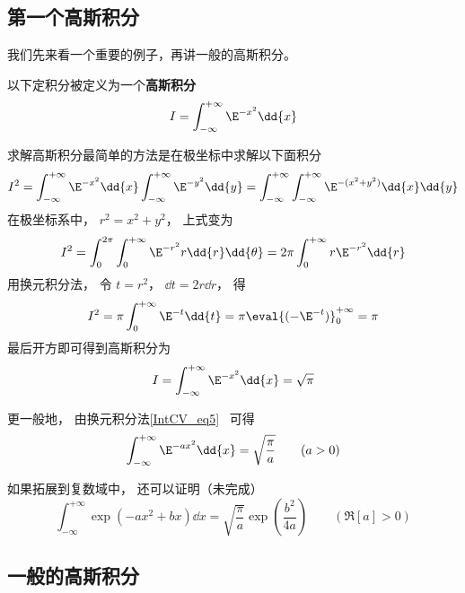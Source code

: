 

\subsection{第一个高斯积分}

我们先来看一个重要的例子，再讲一般的高斯积分。

以下定积分被定义为一个\textbf{高斯积分}
\begin{equation}
I = \int_{-\infty}^{+\infty} \E^{-x^2}\dd{x}
\end{equation}

求解高斯积分最简单的方法是在极坐标中求解以下面积分
\begin{equation}
I^2 = \int_{-\infty}^{+\infty} \E^{-x^2}\dd{x} \int_{-\infty}^{+\infty} \E^{-y^2}\dd{y}
=\int_{-\infty}^{+\infty}\int_{-\infty}^{+\infty} \E^{-(x^2 + y^2)} \dd{x}\dd{y}
\end{equation}
在极坐标系中， $r^2 = x^2 + y^2$， 上式变为
\begin{equation}
I^2 = \int_0^{2\pi} \int_0^{+\infty} \E^{-r^2} r\dd{r}\dd{\theta}
= 2\pi \int_0^{+\infty} r\E^{-r^2} \dd{r}
\end{equation}
用换元积分法， 令 $t = r^2$， $\dd{t} = 2r\dd{r}$， 得
\begin{equation}
I^2 = \pi \int_0^{+\infty} \E^{-t} \dd{t} = \pi \eval{(-\E^{-t})}_0^{+\infty} = \pi
\end{equation}
最后开方即可得到高斯积分为
\begin{equation}\label{GsInt_eq1}
I = \int_{-\infty}^{+\infty} \E^{-x^2}\dd{x} = \sqrt{\pi}
\end{equation}

更一般地， 由换元积分法\autoref{IntCV_eq5}~ 可得
\begin{equation}\label{GsInt_eq5}
\int_{-\infty}^{+\infty} \E^{-a x^2}\dd{x} = \sqrt{\frac{\pi}{a}} \qquad (a > 0)
\end{equation}

如果拓展到复数域中， 还可以证明（未完成）
\begin{equation}\label{GsInt_eq4}
\int_{-\infty}^{+\infty} \exp(-ax^2 + bx) \dd{x} = \sqrt{\frac{\pi}{a}} \exp(\frac{b^2}{4a}) \qquad (\Re[a] > 0)
\end{equation}


\subsection{一般的高斯积分}

